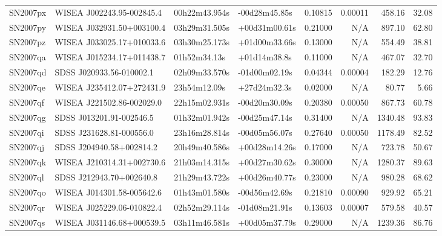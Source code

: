 \begin{longtable}{llllrrrr}
SN2007px         &       WISEA J002243.95-002845.4 &   00h22m43.954s &   -00d28m45.85s &  0.10815 &  0.00011 &   458.16 &       32.08 \\
SN2007py         &       WISEA J032931.50+003100.4 &   03h29m31.505s &   +00d31m00.61s &  0.21000 &      N/A &   897.10 &       62.80 \\
SN2007pz         &       WISEA J033025.17+010033.6 &   03h30m25.173s &   +01d00m33.66s &  0.13000 &      N/A &   554.49 &       38.81 \\
SN2007qa         &       WISEA J015234.17+011438.7 &    01h52m34.13s &    +01d14m38.8s &  0.11000 &      N/A &   467.07 &       32.70 \\
SN2007qd         &        SDSS J020933.56-010002.1 &   02h09m33.570s &   -01d00m02.19s &  0.04344 &  0.00004 &   182.29 &       12.76 \\
SN2007qe         &       WISEA J235412.07+272431.9 &    23h54m12.09s &    +27d24m32.3s &  0.02000 &      N/A &    80.77 &        5.66 \\
SN2007qf         &       WISEA J221502.86-002029.0 &   22h15m02.931s &   -00d20m30.09s &  0.20380 &  0.00050 &   867.73 &       60.78 \\
SN2007qg         &        SDSS J013201.91-002546.5 &   01h32m01.942s &   -00d25m47.14s &  0.31400 &      N/A &  1340.48 &       93.83 \\
SN2007qi         &        SDSS J231628.81-000556.0 &   23h16m28.814s &   -00d05m56.07s &  0.27640 &  0.00050 &  1178.49 &       82.52 \\
SN2007qj         &        SDSS J204940.58+002814.2 &   20h49m40.586s &   +00d28m14.26s &  0.17000 &      N/A &   723.78 &       50.67 \\
SN2007qk         &       WISEA J210314.31+002730.6 &   21h03m14.315s &   +00d27m30.62s &  0.30000 &      N/A &  1280.37 &       89.63 \\
SN2007ql         &        SDSS J212943.70+002640.8 &   21h29m43.722s &   +00d26m40.77s &  0.23000 &      N/A &   980.28 &       68.62 \\
SN2007qo         &       WISEA J014301.58-005642.6 &   01h43m01.580s &   -00d56m42.69s &  0.21810 &  0.00090 &   929.92 &       65.21 \\
SN2007qr         &       WISEA J025229.06-010822.4 &   02h52m29.114s &   -01d08m21.91s &  0.13603 &  0.00007 &   579.58 &       40.57 \\
SN2007qs         &       WISEA J031146.68+000539.5 &   03h11m46.581s &   +00d05m37.79s &  0.29000 &      N/A &  1239.36 &       86.76 \\

\end{longtable}
